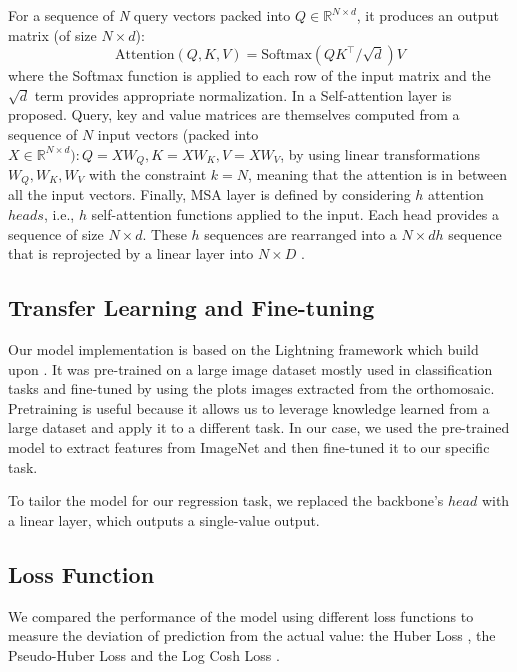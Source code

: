 For a sequence of \textit{N} query vectors packed into $Q \in \mathbb{R} ^{N \times d}$, it produces an output matrix (of size $N \times d$):
\begin{equation} \label{eq:attention} 
\text{Attention}(Q,K,V) = \text{Softmax}(QK^\intercal/\sqrt{d})V 
\end{equation}
where the Softmax function is applied to each row of the input matrix and the $\sqrt{d}$ term provides appropriate normalization. In \cite{vaswani2023attention} a Self-attention layer is proposed. Query, key and value matrices are themselves computed from a sequence of $N$ input vectors (packed into $X \in \mathbb{R} ^{N \times d}): Q = XW_{Q}, K = XW_{K}, V = XW_{V}$, by using linear transformations $W_{Q}, W_{K}, W_{V}$ with the constraint $k = N$, meaning that the attention is in between all the input vectors.
Finally, MSA layer is defined by considering $h$ attention $heads$, i.e., $h$ self-attention functions applied to the input. Each head provides a sequence of size $N \times d$.
These $h$ sequences are rearranged into a $N \times dh$ sequence that is reprojected by a linear layer into $N \times D$ \cite{touvron2021training}.

\subsection{Transfer Learning and Fine-tuning}
\label{subsec:TL-FT}

Our model implementation is based on the Lightning framework \cite{Falcon_PyTorch_Lightning_2019} which build upon \cite{paszke2019pytorch}.
It was pre-trained on a large image dataset\cite{deng2009imagenet} mostly used in classification tasks and fine-tuned by using the plots images extracted from the orthomosaic. Pretraining is useful because it allows us to leverage knowledge learned from a large dataset and apply it to a different task.
In our case, we used the pre-trained model to extract features from ImageNet and then fine-tuned it to our specific task.

To tailor the model for our regression task, we replaced the backbone's $head$ with a linear layer, which outputs a single-value output.

\subsection{Loss Function}
\label{subsec:loss_function}

We compared the performance of the model using different loss functions to measure the deviation of prediction from the actual value: the Huber Loss \cite{huber1964robust}, the Pseudo-Huber Loss \cite{girshick2015fast} and the Log Cosh Loss \cite{moshagen2021finding}.

